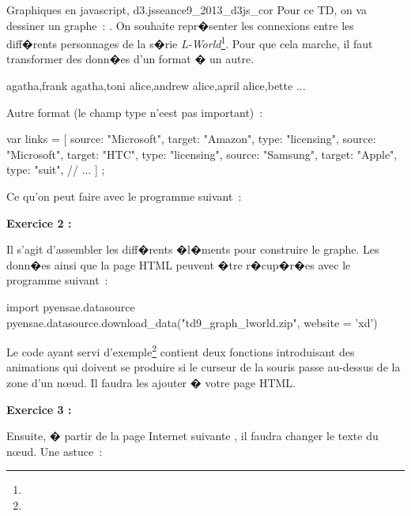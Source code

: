\begin{xtd}{Graphiques en javascript, d3.js}{seance9_2013_d3js_cor}
Pour ce TD, on va dessiner un graphe~: . On souhaite repr�senter les connexions entre les diff�rents personnages de la s�rie \textit{L-World}\footnote{}. Pour que cela marche, il faut transformer des donn�es d'un format � un autre.

\begin{verbatimx}
agatha,frank
agatha,toni
alice,andrew
alice,april
alice,bette
...
\end{verbatimx}

Autre format (le champ type n'eest pas important)~:

\begin{verbatimx}
var links = [
  {source: "Microsoft", target: "Amazon", type: "licensing"},
  {source: "Microsoft", target: "HTC", type: "licensing"},
  {source: "Samsung", target: "Apple", type: "suit"},
	// ...
	] ;
\end{verbatimx}

Ce qu'on peut faire avec le programme suivant~:





\textbf{Exercice 2 :}

Il s'agit d'assembler les diff�rents �l�ments pour construire le graphe. Les donn�es ainsi que la page HTML peuvent �tre r�cup�r�es avec le programme suivant~:

\begin{verbatimx}
import pyensae.datasource
pyensae.datasource.download_data("td9_graph_lworld.zip", website = 'xd') 
\end{verbatimx}





Le code ayant servi d'exemple\footnote{} contient deux fonctions introduisant des animations qui doivent se produire si le curseur de la souris passe au-dessus de la zone d'un n\oe ud. Il faudra les ajouter � votre page HTML.

\textbf{Exercice 3 :}

Ensuite, � partir de la page Internet suivante , il faudra changer le texte du n\oe ud. Une astuce~:


\end{xtd}
